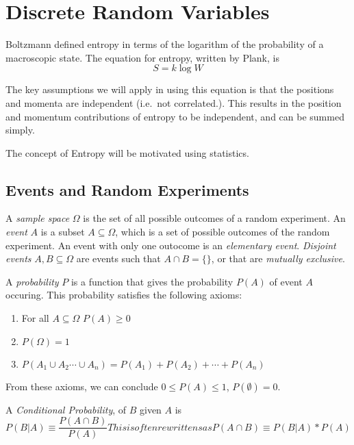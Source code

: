 \chapter{Discrete Random Variables}
Boltzmann defined entropy in terms of the logarithm of the probability of a macroscopic state. The equation for entropy, written by Plank, is
\begin{equation}
	S=k\log W \label{eq2:entropy}
\end{equation}

The key assumptions we will apply in using this equation is that the positions and momenta are independent (i.e.\ not correlated.).
This results in the position and momentum contributions of entropy to be independent, and can be summed simply.

The concept of Entropy will be motivated using statistics.

\section{Events and Random Experiments}
A \emph{sample space} \(\Omega\) is the set of all possible outcomes of a random experiment.
An \emph{event} \(A\) is a subset \(A\subseteq\Omega\), which is a set of possible outcomes of the random experiment.
An event with only one outocome is an \emph{elementary event}. 
\emph{Disjoint events} \(A,B\subseteq \Omega\) are events such that \(A\cap B=\{\}\), or that are \emph{mutually exclusive}.

A \emph{probability} \(P\) is a function that gives the probability \(P(A)\) of event \(A\) occuring. This probability satisfies the following axioms:
\begin{enumerate}
	\item For all \(A\subseteq\Omega\) \(P(A)\geq0\)
	\item \(P(\Omega)=1\)
	\item \(P(A_1\cup A_2 \cdots \cup A_n)=P(A_1)+P(A_2)+\cdots+P(A_n)\)
\end{enumerate}

From these axioms, we can conclude \(0\le P(A)\le 1\), \(P(\emptyset)=0\).

A \emph{Conditional Probability}, of \(B\) given \(A\) is
\begin{subequations}
\begin{equation}
	P(B|A)\equiv\frac{P(A\cap B)}{P(A)}\label{eq2:condproba}
\end{equation}
This is often rewrittens as
\begin{equation}
	P(A\cap B)\equiv P(B|A)*P(A)\label{eq2:condprobb}
\end{equation}
\end{subequations}

